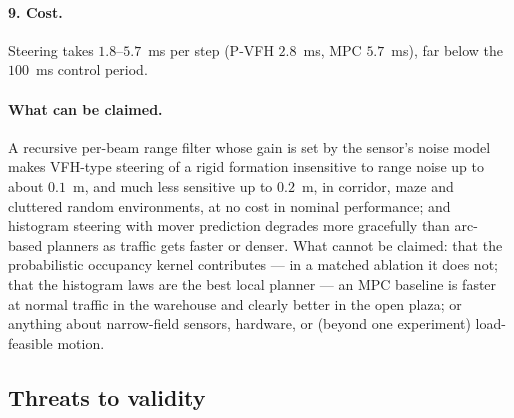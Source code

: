 \paragraph{9. Cost.} Steering takes $1.8$--$5.7$~ms per step (P-VFH
$2.8$~ms, MPC $5.7$~ms), far below the $100$~ms control period.

\paragraph{What can be claimed.} A recursive per-beam range filter whose
gain is set by the sensor's noise model makes VFH-type steering of a rigid
formation insensitive to range noise up to about $0.1$~m, and much less
sensitive up to $0.2$~m, in corridor, maze and cluttered random
environments, at no cost in nominal performance; and histogram steering
with mover prediction degrades more gracefully than arc-based planners as
traffic gets faster or denser. What cannot be claimed: that the
probabilistic occupancy kernel contributes --- in a matched ablation it
does not; that the histogram laws are the best local planner --- an MPC
baseline is faster at normal traffic in the warehouse and clearly better
in the open plaza; or anything about narrow-field sensors, hardware, or
(beyond one experiment) load-feasible motion.

\subsection{Threats to validity}

